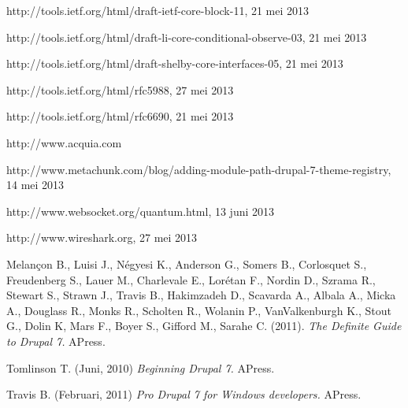\begin{thebibliography}{99}
 http://tools.ietf.org/html/draft-ietf-core-block-11, 21 mei 2013

 http://tools.ietf.org/html/draft-li-core-conditional-observe-03, 21 mei 2013

 http://tools.ietf.org/html/draft-shelby-core-interfaces-05, 21 mei 2013

 http://tools.ietf.org/html/rfc5988, 27 mei 2013

 http://tools.ietf.org/html/rfc6690, 21 mei 2013

 http://www.acquia.com

 http://www.metachunk.com/blog/adding-module-path-drupal-7-theme-registry, 14 mei 2013

 http://www.websocket.org/quantum.html, 13 juni 2013

 http://www.wireshark.org, 27 mei 2013

 Melançon B., Luisi J., Négyesi K., Anderson G., Somers B., Corlosquet S., Freudenberg S., Lauer M., Charlevale E., Lorétan F., Nordin D., Szrama R., Stewart S., Strawn J., Travis B., Hakimzadeh D., Scavarda A., Albala A., Micka A., Douglass R., Monks R., Scholten R., Wolanin P., VanValkenburgh K., Stout G., Dolin K, Mars F., Boyer S., Gifford M., Sarahe C. (2011). {\em The Definite Guide to Drupal 7.} APress.

 Tomlinson T. (Juni, 2010) {\em Beginning Drupal 7.} APress.

 Travis B. (Februari, 2011) {\em Pro Drupal 7 for Windows developers.} APress.

\end{thebibliography}

